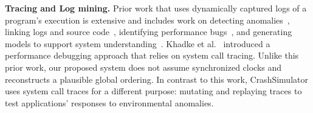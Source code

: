 %
%
%
%

\noindent
{\bf Tracing and Log mining.}  Prior work that uses dynamically captured logs
of a program's execution is extensive and includes work on detecting
anomalies~\cite{pinpoint, jiang_abnormal_trace_detection_icac_2005,
  xu2009detecting, lou2010mining2}, linking logs and source
code~\cite{yuan2010sherlog}, identifying performance
bugs~\cite{sambasivan_req_flow_nsdi_2011, perf_skeletons_ipdps_2008},
and generating models to support system
understanding~\cite{beschastnikh_synoptic_fse_2011, csight_icse_2014}.
Khadke et al.~\cite{khadketransparent} introduced a performance
debugging approach that relies on system call tracing. Unlike this
prior work, our proposed system does not assume synchronized clocks and
reconstructs a plausible global ordering.
In contrast to this work, CrashSimulator uses system call traces
for a different purpose: mutating and replaying traces to test
applications' responses to environmental anomalies.

